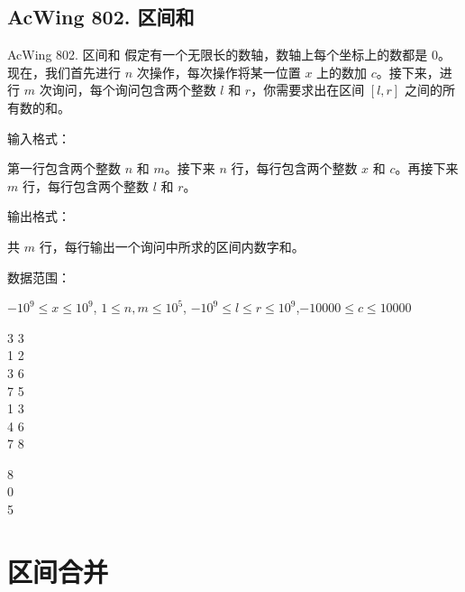 \subsection{AcWing 802. 区间和}
\begin{titledbox}{AcWing 802. 区间和}
假定有一个无限长的数轴，数轴上每个坐标上的数都是 $0$。现在，我们首先进行 $n$ 次操作，每次操作将某一位置 $x$ 上的数加 $c$。接下来，进行 $m$ 次询问，每个询问包含两个整数 $l$ 和 $r$，你需要求出在区间 $[l, r]$ 之间的所有数的和。

输入格式：

第一行包含两个整数 $n$ 和 $m$。接下来 $n$ 行，每行包含两个整数 $x$ 和 $c$。再接下来 $m$ 行，每行包含两个整数 $l$ 和 $r$。

输出格式：

共 $m$ 行，每行输出一个询问中所求的区间内数字和。

数据范围：

$-10^9 \le x \le 10^9$, $1 \le n,m \le 10^5$, $-10^9 \le l \le r \le 10^9$,$-10000 \le c \le 10000$

\begin{inputblock}
    3 3 \\
    1 2 \\
    3 6 \\
    7 5 \\
    1 3 \\
    4 6 \\
    7 8
\end{inputblock}
\begin{outputblock}
    8 \\
    0 \\
    5
\end{outputblock}
\end{titledbox}


\section{区间合并}
